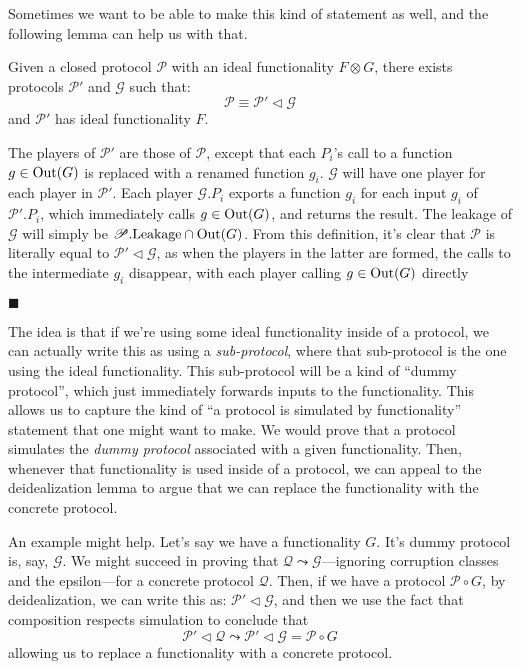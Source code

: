 Sometimes we want to be able to make this kind of statement as well,
and the following lemma can help us with that.

\begin{lemma}
  Given a closed protocol $\mathscr{P}$ with an ideal functionality $F \otimes G$,
  there exists protocols $\mathscr{P}'$ and $\mathscr{G}$
  such that:
  $$
  \mathscr{P} \equiv \mathscr{P}' \lhd \mathscr{G}
  $$
  and $\mathscr{P}'$ has ideal functionality $F$.


   The players of $\mathscr{P}'$ are those of $\mathscr{P}$,
  except that each $P_i$'s call to a function $g \in \text{Out}(G)$ is replaced with
  a renamed function $g_i$.
  $\mathscr{G}$ will have one player for each player in $\mathscr{P}'$.
  Each player $\mathscr{G}.P_i$ exports a function $g_i$ for each input
  $g_i$ of $\mathscr{P}'.P_i$, which immediately calls $g \in \text{Out}(G)$,
  and returns the result.
  The leakage of $\mathscr{G}$ will simply be $\mathscr{P}.\text{Leakage} \cap \text{Out}(G)$.
  From this definition, it's clear that $\mathscr{P}$ is literally equal
  to $\mathscr{P}' \lhd \mathscr{G}$, as when the players in the latter
  are formed, the calls to the intermediate $g_i$ disappear,
  with each player calling $g \in \text{Out}(G)$ directly

  $\blacksquare$
\end{lemma}

The idea is that if we're using some ideal functionality inside
of a protocol, we can actually write this as using
a \emph{sub-protocol}, where that sub-protocol is the one using
the ideal functionality.
This sub-protocol will be a kind of ``dummy protocol'',
which just immediately forwards inputs to the functionality.
This allows us to capture the kind of ``a protocol is simulated by functionality''
statement that one might want to make.
We would prove that a protocol simulates the \emph{dummy protocol}
associated with a given functionality.
Then, whenever that functionality is used inside of a protocol,
we can appeal to the deidealization lemma to argue that we can
replace the functionality with the concrete protocol.

An example might help.
Let's say we have a functionality $G$.
It's dummy protocol is, say, $\mathscr{G}$.
We might succeed in proving that
$\mathscr{Q} \leadsto \mathscr{G}$---ignoring corruption classes and the epsilon---for a concrete protocol $\mathscr{Q}$.
Then, if we have a protocol $\mathscr{P} \circ G$,
by deidealization, we can write this as:
$\mathscr{P}' \lhd \mathscr{G}$, and then we use the fact that composition
respects simulation to conclude that
$$
\mathscr{P}' \lhd \mathscr{Q} \leadsto 
\mathscr{P}' \lhd \mathscr{G} = \mathscr{P} \circ G
$$
allowing us to replace a functionality with a concrete protocol.

